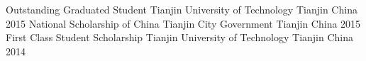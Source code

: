 \begin{cvhonors}
  \cvhonor
    {Outstanding Graduated Student}
    {Tianjin University of Technology}
    {Tianjin China}
    {2015}
  \cvhonor
    {National Scholarship of China}
    {Tianjin City Government}
    {Tianjin China}
    {2015}
  \cvhonor
    {First Class Student Scholarship}
    {Tianjin University of Technology}
    {Tianjin China}
    {2014}
  
\end{cvhonors}

